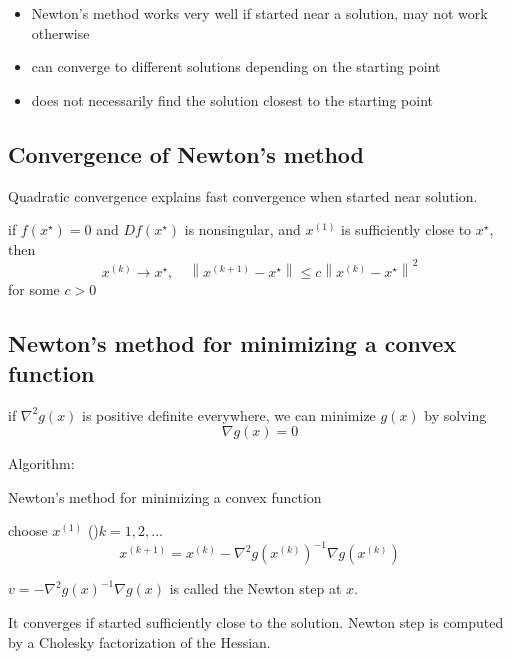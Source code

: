 \begin{itemize}
    \item Newton's method works very well if started near a solution, may not work otherwise
    \item can converge to different solutions depending on the starting point
    \item does not necessarily find the solution closest to the starting point
\end{itemize}

\subsection{Convergence of Newton's method}

Quadratic convergence explains fast convergence when started near solution.

\begin{theorem}
    if $ f\left(x^{\star}\right)=0 $ and $ D f\left(x^{\star}\right) $ is nonsingular, and $ x^{(1)} $ is sufficiently close to $ x^{\star} $, then
\begin{equation}
x^{(k)} \rightarrow x^{\star}, \quad\left\|x^{(k+1)}-x^{\star}\right\| \leq c\left\|x^{(k)}-x^{\star}\right\|^{2}
\end{equation}
for some $ c>0 $
\end{theorem}

\subsection{Newton's method for minimizing a convex function}

if $ \nabla^{2} g(x) $ is positive definite everywhere, we can minimize $ g(x) $ by solving
\begin{equation}
\nabla g(x)=0
\end{equation}


Algorithm:
\begin{algorithm}[htbp]
    \caption{Newton's method for minimizing a convex function}
    choose $ x^{(1)} $\;
    \While(){$ k=1,2, \ldots $}{
        \begin{equation}
x^{(k+1)}=x^{(k)}-\nabla^{2} g\left(x^{(k)}\right)^{-1} \nabla g\left(x^{(k)}\right)
\end{equation}\;
    }
\end{algorithm}

$ v=-\nabla^{2} g(x)^{-1} \nabla g(x) $ is called the Newton step at $ x $.

It converges if started sufficiently close to the solution. Newton step is computed by a Cholesky factorization of the Hessian.

